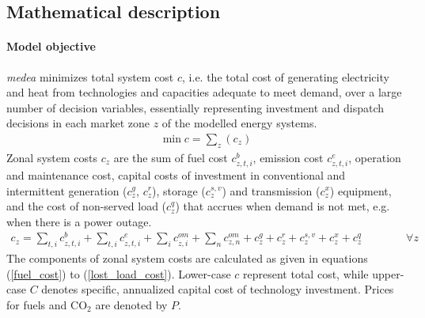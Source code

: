 \documentclass[final, 3p, times]{elsarticle} %
\newcommand{\COO}{\ensuremath{\mathrm{CO_2}} }
\begin{document}
    \newpage

    \subsection{Mathematical description} \label{mathmodel}

    \paragraph{Model objective}
    \emph{medea} minimizes total system cost $c$, i.e. the total cost of generating electricity and heat from technologies and capacities adequate to meet demand, over a large number of decision variables, essentially representing investment and dispatch decisions in each market zone $z$ of the modelled energy systems.
    \begin{align}
        \min c = \sum_{z} (c_{z})
    \end{align}
    Zonal system costs $c_{z}$ are the sum of fuel cost $c^{b}_{z,t,i}$, emission cost $c^{e}_{z,t,i}$, operation and maintenance cost, capital costs of investment in conventional and intermittent generation ($c^{g}_{z}$, $c^{r}_{z}$), storage ($c^{s,v}_{z}$) and transmission ($c^{x}_{z}$) equipment, and the cost of non-served load ($c^{q}_{z}$) that accrues when demand is not met, e.g. when there is a power outage.
    \begin{align}
        c_{z} = \sum_{t,i}  c^{b}_{z,t,i} + \sum_{t,i} c^{e}_{z,t,i} + \sum_{i} c^{om}_{z,i} + \sum_{n} c^{om}_{z,n} + c^{g}_{z} +
        c^{r}_{z} + c^{s,v}_{z} + c^{x}_{z} + c^{q}_{z} \qquad \qquad \forall z
    \end{align}
    The components of zonal system costs are calculated as given in equations (\ref{fuel_cost}) to (\ref{lost_load_cost}).
    Lower-case $c$ represent total cost, while upper-case $C$ denotes specific, annualized capital cost of technology investment.
    Prices for fuels and \COO are denoted by $P$.
\end{document}
